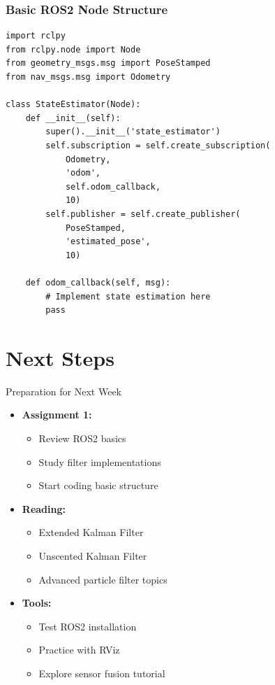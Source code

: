 \documentclass[aspectratio=169]{beamer}
\begin{document}
\begin{frame}[fragile]
\frametitle{Basic ROS2 Node Structure}
\begin{lstlisting}
import rclpy
from rclpy.node import Node
from geometry_msgs.msg import PoseStamped
from nav_msgs.msg import Odometry

class StateEstimator(Node):
    def __init__(self):
        super().__init__('state_estimator')
        self.subscription = self.create_subscription(
            Odometry,
            'odom',
            self.odom_callback,
            10)
        self.publisher = self.create_publisher(
            PoseStamped,
            'estimated_pose',
            10)
            
    def odom_callback(self, msg):
        # Implement state estimation here
        pass
\end{lstlisting}
\end{frame}

\section{Next Steps}

\begin{frame}{Preparation for Next Week}
    \begin{itemize}
        \item<1-> \textbf{Assignment 1:}
            \begin{itemize}
                \item Review ROS2 basics
                \item Study filter implementations
                \item Start coding basic structure
            \end{itemize}
        \item<2-> \textbf{Reading:}
            \begin{itemize}
                \item Extended Kalman Filter
                \item Unscented Kalman Filter
                \item Advanced particle filter topics
            \end{itemize}
        \item<3-> \textbf{Tools:}
            \begin{itemize}
                \item Test ROS2 installation
                \item Practice with RViz
                \item Explore sensor fusion tutorial
            \end{itemize}
    \end{itemize}
\end{frame}
\end{document}
